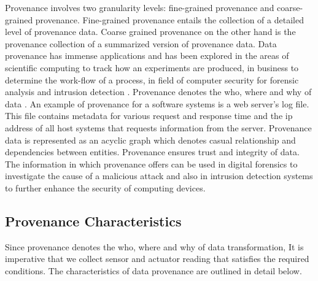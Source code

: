 Provenance involves two granularity levels: fine-grained provenance and coarse-grained provenance. Fine-grained provenance \cite{glavic_case_2011} entails the collection of a detailed level of provenance data. Coarse grained provenance on the other hand is the provenance collection of a summarized version of provenance data. Data provenance has immense applications and has been explored in the areas of scientific computing \cite{groth, altintas} to track how an experiments are produced, in business to determine the work-flow of  a process, in field of computer security for forensic analysis and intrusion detection \cite{bates_towards_2013, muniswamy-reddy_provenance_2010, muniswamy_reddy} . Provenance denotes the who, where and why of data \cite{cheney_provenance_2009}. An example of provenance for a software systems is a web server's log file. This file contains metadata for various request and response time and the ip address of all host systems that requests information from the server. Provenance data is represented as an acyclic graph which denotes casual relationship and dependencies between entities. Provenance ensures trust and integrity of data. The information in which provenance offers can be used in digital forensics to investigate the cause of a malicious attack and also in intrusion detection systems to further enhance the security of computing devices. 





\subsection{Provenance Characteristics}

Since provenance denotes the who, where and why of data transformation, It is imperative that we collect sensor and actuator reading that satisfies the required conditions. The characteristics of data provenance are outlined in detail below.


